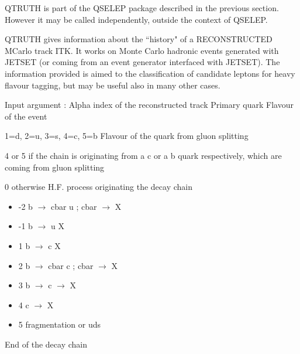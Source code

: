  
     QTRUTH is part of the QSELEP package described in the previous section. However it may be called
     independently, outside the context of QSELEP.
 
     QTRUTH gives information about the ``history" of
     a RECONSTRUCTED MCarlo track ITK. It works on Monte Carlo
     hadronic events generated with JETSET (or coming from an
     event generator interfaced with JETSET). The information
     provided is aimed to the classification of candidate
     leptons for heavy flavour tagging, but may be useful
     also in many other cases.
 
 
\begin{indentlist}{ 3.50cm}{ 3.75cm}
      Input argument :   Alpha index of the reconstructed track
      Primary quark Flavour of the event
 
                              1=d, 2=u, 3=s, 4=c, 5=b
      Flavour of the quark from gluon splitting
 
                              4 or 5 if the chain is originating from a
                                     c or a b quark respectively, which
                                     are coming from gluon splitting
 
                              0      otherwise
   H.F. process originating the decay chain
 
\begin{itemize}
\item                         -2    b $\rightarrow$ cbar u ; cbar $\rightarrow$ X
\item                         -1    b $\rightarrow$ u X
\item                          1    b $\rightarrow$ c X
\item                          2    b $\rightarrow$ cbar c ; cbar $\rightarrow$ X
\item                          3    b $\rightarrow$ c $\rightarrow$ X
\item                          4    c $\rightarrow$ X
\item                          5    fragmentation or uds
\end{itemize}
    End of the decay chain
 

\end{indentlist}
